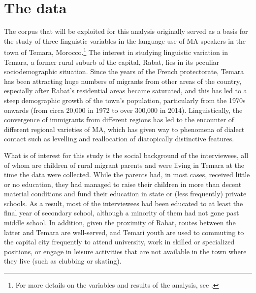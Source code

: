 \documentclass[output=paper]{langscibook}
\begin{document}
\section{The data}
The corpus that will be exploited for this analysis originally served as a basis for the study of three linguistic variables in the language use of \gls*{MA} speakers in the town of Temara, Morocco.\footnote{For more details on the variables and results of the analysis, see \citet{falchetta_social_2019}.} The interest in studying linguistic variation in Temara, a former rural suburb of the capital, Rabat, lies in its peculiar sociodemographic situation. Since the years of the French protectorate, Temara has been attracting huge numbers of migrants from other areas of the country, especially after Rabat’s residential areas became saturated, and this has led to a steep demographic growth of the town’s population, particularly from the 1970s onwards (from circa 20,000 in 1972 to over 300,000 in 2014). Linguistically, the convergence of immigrants from different regions has led to the encounter of different regional varieties of \gls*{MA}, which has given way to phenomena of dialect contact such as levelling and reallocation of diatopically distinctive features. 

What is of interest for this study is the social background of the interviewees, all of whom are children of rural migrant parents and were living in Temara at the time the data were collected. While the parents had, in most cases, received little or no education, they had managed to raise their children in more than decent material conditions and fund their education in state or (less frequently) private schools. As a result, most of the interviewees had been educated to at least the final year of secondary school, although a minority of them had not gone past middle school. In addition, given the proximity of Rabat, routes between the latter and Temara are well-served, and Temari youth are used to commuting to the capital city frequently to attend university, work in skilled or specialized positions, or engage in leisure activities that are not available in the town where they live (such as clubbing or skating).
\end{document}
